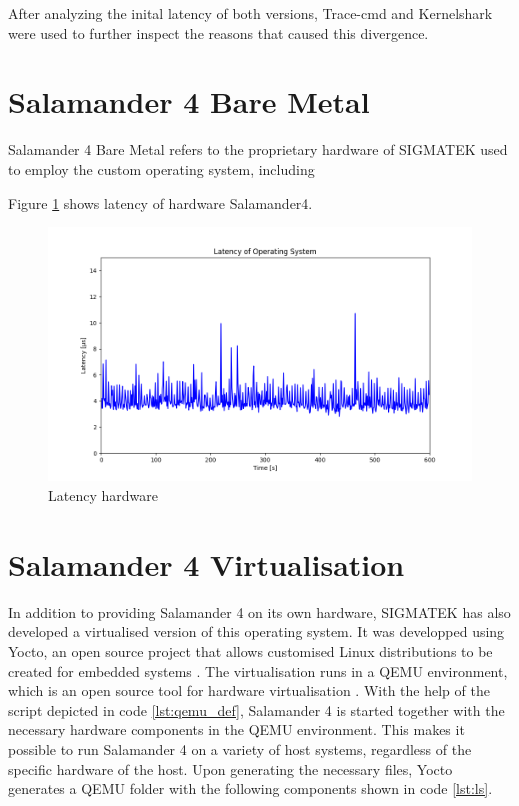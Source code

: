 \documentclass[MMR,Master,english]{twbook}
\begin{document}
After analyzing the inital latency of both versions, Trace-cmd and Kernelshark were used to further inspect the reasons that caused this divergence. 


\section{Salamander 4 Bare Metal}
Salamander 4 Bare Metal refers to the proprietary hardware of SIGMATEK used to employ the custom operating system, including 

Figure \ref{fig:max_latency_hardware} shows latency of hardware Salamander4.
\begin{figure}[H]
  \centering
  \includegraphics[width=0.8\columnwidth]{img/max_latency_hardware.png}
  \caption[Latency hardware]{Latency hardware}
  \label{fig:max_latency_hardware}
\end{figure}


\section{Salamander 4 Virtualisation}
In addition to providing Salamander 4 on its own hardware, SIGMATEK has also developed a virtualised version of this operating system. It was developped using Yocto, an open source project that allows customised Linux distributions to be created for embedded systems \cite{WelcomeYoctoProject}. The virtualisation runs in a QEMU environment, which is an open source tool for hardware virtualisation \cite{QEMU}. With the help of the script depicted in code \ref{lst:qemu_def}, Salamander 4 is started together with the necessary hardware components in the QEMU environment. This makes it possible to run Salamander 4 on a variety of host systems, regardless of the specific hardware of the host. Upon generating the necessary files, Yocto generates a QEMU folder with the following components shown in code \ref{lst:ls}.
\end{document}
